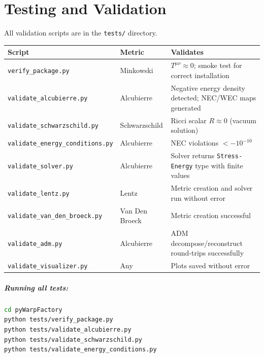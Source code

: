\documentclass[11pt, a4paper, twoside]{report}
\begin{document}
\chapter{Testing and Validation}
\label{chap:tests}

All validation scripts are in the \texttt{tests/} directory.

\begin{center}
\begin{tabularx}{\linewidth}{llX}
  \toprule
  Script & Metric & Validates \\
  \midrule
  \texttt{verify\_package.py}         & Minkowski
  & $T^{\mu\nu} \approx 0$; smoke test for correct installation \\
  \texttt{validate\_alcubierre.py}    & Alcubierre
  & Negative energy density detected; NEC/WEC maps generated \\
  \texttt{validate\_schwarzschild.py} & Schwarzschild
  & Ricci scalar $R \approx 0$ (vacuum solution) \\
  \texttt{validate\_energy\_conditions.py} & Alcubierre
  & NEC violations $<-10^{-10}$ \\
  \texttt{validate\_solver.py}        & Alcubierre
  & Solver returns \texttt{Stress-Energy} type with finite values \\
  \texttt{validate\_lentz.py}         & Lentz
  & Metric creation and solver run without error \\
  \texttt{validate\_van\_den\_broeck.py} & Van Den Broeck
  & Metric creation successful \\
  \texttt{validate\_adm.py}           & Alcubierre
  & ADM decompose/reconstruct round-trips successfully \\
  \texttt{validate\_visualizer.py}    & Any
  & Plots saved without error \\
  \bottomrule
\end{tabularx}
\end{center}

\paragraph{Running all tests:}
\begin{lstlisting}[language=bash]
cd pyWarpFactory
python tests/verify_package.py
python tests/validate_alcubierre.py
python tests/validate_schwarzschild.py
python tests/validate_energy_conditions.py
\end{lstlisting}
\end{document}
